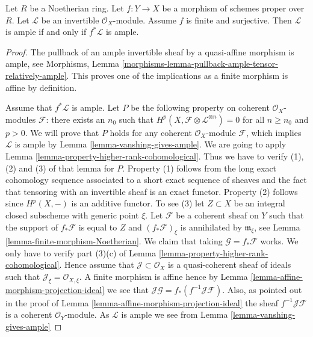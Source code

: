 \begin{lemma}
\label{lemma-surjective-finite-morphism-ample}
Let $R$ be a Noetherian ring. Let $f : Y \to X$ be a morphism of
schemes proper over $R$. Let $\mathcal{L}$ be an
invertible $\mathcal{O}_X$-module. Assume $f$ is finite and surjective.
Then $\mathcal{L}$ is ample if and only if $f^*\mathcal{L}$ is ample.
\end{lemma}

\begin{proof}
The pullback of an ample invertible sheaf by a quasi-affine morphism
is ample, see Morphisms, Lemma
\ref{morphisms-lemma-pullback-ample-tensor-relatively-ample}.
This proves one of the implications as a finite morphism is affine
by definition.

\medskip\noindent
Assume that $f^*\mathcal{L}$ is ample. Let $P$ be the following property on
coherent $\mathcal{O}_X$-modules $\mathcal{F}$: there exists an $n_0$
such that $H^p(X, \mathcal{F} \otimes \mathcal{L}^{\otimes n}) = 0$
for all $n \geq n_0$ and $p > 0$. We will prove that $P$ holds
for any coherent $\mathcal{O}_X$-module $\mathcal{F}$, which implies
$\mathcal{L}$ is ample by Lemma \ref{lemma-vanshing-gives-ample}.
We are going to apply Lemma \ref{lemma-property-higher-rank-cohomological}.
Thus we have to verify (1), (2) and (3) of that lemma for $P$.
Property (1) follows from the long exact cohomology sequence associated
to a short exact sequence of sheaves and the fact that tensoring with
an invertible sheaf is an exact functor. Property (2) follows since
$H^p(X, -)$ is an additive functor. To see (3) let $Z \subset X$ be
an integral closed subscheme with generic point $\xi$.
Let $\mathcal{F}$ be a coherent sheaf on $Y$ such that
the support of $f_*\mathcal{F}$ is equal to $Z$
and $(f_*\mathcal{F})_\xi$ is annihilated by $\mathfrak m_\xi$,
see Lemma \ref{lemma-finite-morphism-Noetherian}. We claim that
taking $\mathcal{G} = f_*\mathcal{F}$ works. We only have to verify
part (3)(c) of Lemma \ref{lemma-property-higher-rank-cohomological}.
Hence assume that $\mathcal{J} \subset \mathcal{O}_X$ is a
quasi-coherent sheaf of ideals such that
$\mathcal{J}_\xi = \mathcal{O}_{X, \xi}$.
A finite morphism is affine hence by
Lemma \ref{lemma-affine-morphism-projection-ideal} we see that
$\mathcal{J}\mathcal{G} = f_*(f^{-1}\mathcal{J}\mathcal{F})$.
Also, as pointed out in the proof of
Lemma \ref{lemma-affine-morphism-projection-ideal} the sheaf
$f^{-1}\mathcal{J}\mathcal{F}$ is a coherent $\mathcal{O}_Y$-module.
As $\mathcal{L}$ is ample we see from Lemma \ref{lemma-vanshing-gives-ample}

\end{proof}
